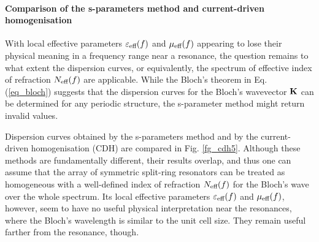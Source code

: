 
\paragraph{Comparison of the s-parameters method and current-driven homogenisation}%
With local effective parameters $\varepsilon_{\text{eff} }(f)$ and $\mu_{\text{eff} }(f)$ appearing to lose their physical meaning in a frequency range near a resonance, the question remains to what extent the dispersion curves, or equivalently, the spectrum of effective index of refraction $N_{\text{eff} }(f)$ are applicable. While the Bloch's theorem in Eq. (\ref{eq_bloch}) suggests that the dispersion curves for the Bloch's wavevector ${\mathbf{K}}$ can be determined for any periodic structure, the s-parameter method might return invalid values.

Dispersion curves obtained by the s-parameters method and by the current-driven homogenisation (CDH) are compared in Fig. \ref{fg_cdh5}. Although these methods are fundamentally different, their results overlap, and thus one can assume that the array of symmetric split-ring resonators can be treated as homogeneous with a well-defined index of refraction $N_{\text{eff} }(f)$ for the Bloch's wave over the whole spectrum. Its local effective parameters $\varepsilon_{\text{eff} }(f)$ and $\mu_{\text{eff} }(f)$, however, seem to have no useful physical interpretation near the resonances, where the Bloch's wavelength is similar to the unit cell size. They remain useful farther from the resonance, though. %

